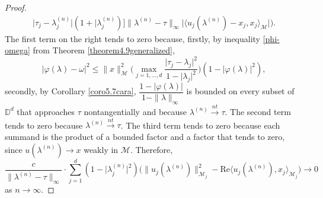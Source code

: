 \documentclass[11pt, reqno]{amsart}
\newcommand\1{\boldsymbol {1}}
\numberwithin{equation}{section}
\begin{document}
\begin{proof}
\begin{align}
{{\lvert \tau_{j}-\lambda^{(n)}_{j}\rvert}{(1+\lvert\lambda^{(n)}_{j})}
\Big]}{\|\lambda^{(n)}-\tau\|_{\infty}}\lvert\langle u_{j}(\lambda^{(n)})-x_{j},x_{j}\rangle_{\mathcal{M}}\rvert \Bigg).
\end{align} 
The first term on the right tends to zero because, firstly, by inequality \eqref{phi-omega} from Theorem \ref{theorem4.9generalized},
\begin{equation}\label{phi-omega-2}
 \lvert \varphi(\lambda)-\omega\rvert^{2} \leq  \|x\|_{\mathcal{M}}^{2}\bigg(\max_{j=1,\hdots,d}\dfrac{\lvert \tau_{j}-\lambda_{j}\rvert^{2}}{1-\lvert \lambda_{j}\rvert^{2}}\bigg)(1-\lvert \varphi(\lambda) \rvert^{2}),
\end{equation}
 secondly, by Corollary \ref{coro5.7cara},   $\dfrac{1-\lvert \varphi(\lambda) \rvert}{1-\|\lambda\|_{\infty}}$ is bounded on every subset of $\mathbb{D}^{d}$ that approaches $\tau$ nontangentially and because $\lambda^{(n)}{\overset{nt}\rightarrow}\tau$. 
The second term tends to zero because $\lambda^{(n)}{\overset{nt}\rightarrow}\tau$. The third term tends to zero because
each summand is the product of a bounded factor and a factor that tends to zero, since $u(\lambda^{(n)})\rightarrow x$ weakly in $\mathcal{M}$. Therefore,
\begin{equation}\label{equation5272}
 \dfrac{c}{\|\lambda^{(n)}-\tau\|_{\infty}}\cdot\sum_{j=1}^{d}(1-\lvert \lambda^{(n)}_{j} \rvert^{2})\Big(\|u_{j}(\lambda^{(n)})\|_{\mathcal{M}_{j}}^{2}-\mathrm{Re} \langle u_{j}(\lambda^{(n)}),x_{j}\rangle_{\mathcal{M}_{j}} \Big) \to 0
\end{equation}
as $n \rightarrow  \infty$.


\end{proof}
\end{document}
